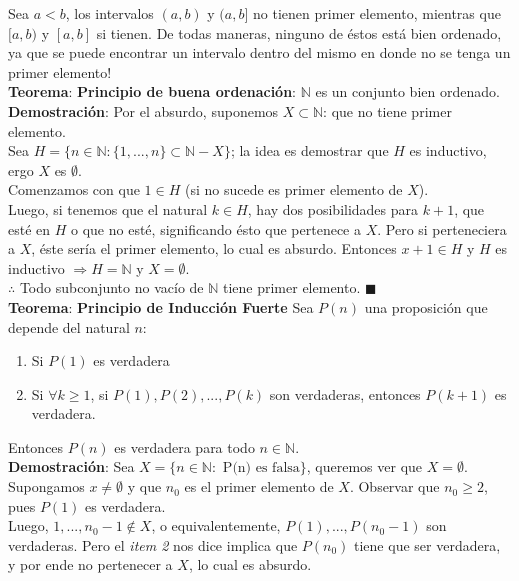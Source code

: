 \documentclass[11pt,a4paper]{article}
\newcommand*{\QEDA}{\null\nobreak\hfill\ensuremath{\blacksquare}}
\begin{document}
\noindent Sea $a<b$, los intervalos $(a,b)$ y $(a,b]$ no tienen primer elemento, mientras que $[a,b)$ y $[a,b]$ si tienen. De todas maneras, ninguno de \'estos est\'a bien ordenado, ya que se puede encontrar un intervalo dentro del mismo en donde no se tenga un primer elemento!\\

\noindent \textbf{Teorema}: \textbf{Principio de buena ordenaci\'on}: $\mathbb{N}$ es un conjunto bien ordenado.\\
\textbf{Demostraci\'on}: Por el absurdo, suponemos $X \subset \mathbb{N}$: que no tiene primer elemento.\\
Sea $H = \{n\in\mathbb{N}: \{1,...,n\} \subset \mathbb{N} - X \}$; la idea es demostrar que $H$ es inductivo, ergo $X$ es $\emptyset$.\\ Comenzamos con que $1 \in H$ (si no sucede es primer elemento de $X$). \\
Luego, si tenemos que el natural $k\in H$, hay dos posibilidades para $k+1$, que est\'e en $H$ o que no est\'e, significando \'esto que pertenece a $X$. Pero si perteneciera a $X$, \'este ser\'ia el primer elemento, lo cual es absurdo. Entonces $x+1 \in H$ y $H$ es inductivo $\Rightarrow H = \mathbb{N}$ y $X=\emptyset$.\\
$\therefore$ Todo subconjunto no vac\'io de $\mathbb{N}$ tiene primer elemento. \QEDA\\

\noindent \textbf{Teorema}: \textbf{Principio de Inducci\'on Fuerte}
Sea $P(n)$ una proposici\'on que depende del natural $n$:
\begin{enumerate}
\item Si $P(1)$ es verdadera
\item Si $\forall k \geq 1$, si $P(1), P(2),...,P(k)$ son verdaderas, entonces $P(k+1)$ es verdadera.
\end{enumerate}
Entonces $P(n)$ es verdadera para todo $n\in\mathbb{N}$.\\
\textbf{Demostraci\'on}: Sea $X = \{n\in\mathbb{N} : \text{ P(n) es falsa}\}$, queremos ver que $X=\emptyset$. \\
Supongamos $x\not=\emptyset$ y que $n_0$ es el primer elemento de $X$. Observar que $n_0 \geq 2$, pues $P(1)$ es verdadera.\\
Luego, $1,...,n_0-1 \not \in X$, o equivalentemente, $P(1),...,P(n_0-1)$ son verdaderas. Pero el \textit{item 2} nos dice implica que $P(n_0)$ tiene que ser verdadera, y por ende no pertenecer a $X$, lo cual es absurdo.
\end{document}
